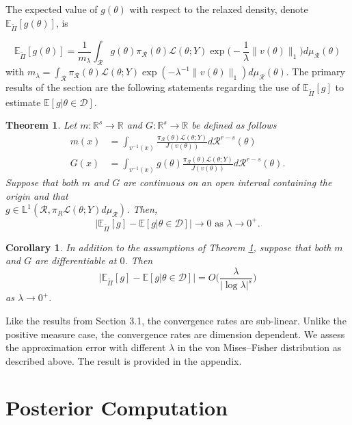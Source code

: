 \documentclass[10pt,fleqn]{article}
\newtheorem{theorem}{Theorem} \newtheorem{lemma}{Lemma}
\newtheorem{corollary}{Corollary} \newtheorem{remark}{Remark}
\newcommand{\bb}[1]{\mathbb{#1}} \newcommand{\mc}[1]{\mathcal{#1}}
\DeclareMathOperator{\1}{\mathbbm{1}} \DeclareMathOperator{\bigO}{\mc O}
\begin{document}
The expected value of
$g(\theta)$ with respect to the relaxed density, denote
$\bb E_{\tilde{\Pi}}[g(\theta)] $, is

$$\bb E_{\tilde{\Pi}}[g(\theta)] = \frac{1}{m_\lambda}
\int_\mathcal{R} g(\theta) \pi_\mathcal{R}(\theta)
\mathcal{L}(\theta;Y)\exp\bigg(-\frac{1}{\lambda}\|v (\theta)\|_1\bigg)
d\mu_\mathcal{R}(\theta) $$
with $m_\lambda =
\int_\mathcal{R}  \pi_\mathcal{R}(\theta)
\mathcal{L}(\theta;Y)\exp(-{\lambda^{-1}}\|v (\theta)\|_1)
d\mu_\mathcal{R}(\theta).$
The primary results of the section are the following statements regarding
the use of $\bb E_{\tilde{\Pi}}[g]$ to estimate $\bb E[g|\theta\in\mathcal{D}]$.

\begin{theorem} \label{THM:Relaxed_Expectation_Convergence_Measure_Zero}
Let $m:\mathbb{R}^s\to \mathbb{R}$ and $G:\mathbb{R}^s\to
\mathbb{R}$ be defined as follows \begin{align*} m(x) & =
\int_{v^{-1}(x)} \frac{\pi_\mathcal{R}(\theta)
\mathcal{L}(\theta;Y)}{J(v(\theta))}
d\mathcal{R}^{r-s}(\theta) \\ G(x) &= \int_{v^{-1}(x)}
g(\theta)\frac{\pi_\mathcal{R}(\theta)
\mathcal{L}(\theta;Y)}{J(v(\theta))} d\mathcal{R}^{r-s}(\theta).
\end{align*} Suppose that both $m$ and $G$ are continuous on an open
interval containing the origin and that \\
$g\in\mathbb{L}^1(\mathcal{R},\pi_R\mathcal{L}(\theta;Y)d\mu_\mathcal{R})$.
Then, $$\bigg|\bb E_{\tilde{\Pi}}[g] - \bb E[g|\theta \in \mathcal{D}]\bigg| \to 0
\text{ as } \lambda\to 0^+.$$ \end{theorem}

\begin{corollary} In addition to the assumptions of Theorem
\ref{THM:Relaxed_Expectation_Convergence_Measure_Zero}, suppose
that both $m$ and $G$ are differentiable at $0$. Then
$$\bigg|\bb E_{\tilde{\Pi}}[g] - \bb E[g|\theta \in \mathcal{D}] \bigg| =
O\bigg(\frac{\lambda}{|\log \lambda|^s}\bigg)$$ as $\lambda \to
0^+.$ \end{corollary}

Like the results from Section 3.1, the convergence rates are sub-linear. Unlike the positive measure case, the convergence rates are dimension dependent. We assess the approximation error with different $\lambda$ in the von Mises--Fisher distribution as described above. The result is provided in the appendix. 


\section{Posterior Computation}
\end{document}
